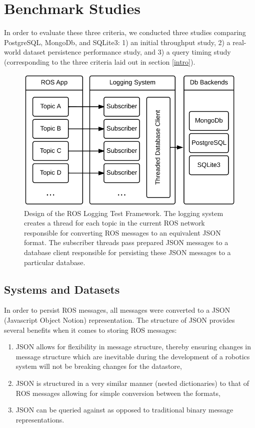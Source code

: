 \documentclass[nocopyrightspace]{acm_proc_article-sp}
\begin{document}
\section{Benchmark Studies}
In order to evaluate these three criteria, we conducted three studies comparing PostgreSQL, MongoDb, and SQLite3: 1) an initial throughput study, 2) a real-world dataset persistence performance study, and 3) a query timing study (corresponding to the three criteria laid out in section \ref{intro}).

\begin{figure}
    \centering
    \includegraphics[width=\linewidth]{images/roslog}
    \caption{Design of the ROS Logging Test Framework. The logging system creates a thread for each topic in the current ROS network responsible for converting ROS messages to an equivalent JSON format. The subscriber threads pass prepared JSON messages to a database client responsible for persisting these JSON messages to a particular database.}
    \label{fig:roslog}
\end{figure}

\subsection{Systems and Datasets}
In order to persist ROS messages, all messages were converted to a JSON (Javascript Object Notion) representation. The structure of JSON provides several benefits when it comes to storing ROS messages:
\begin{enumerate}
\item JSON allows for flexibility in message structure, thereby ensuring changes in message structure which are inevitable during the development of a robotics system will not be breaking changes for the datastore,
\item JSON is structured in a very similar manner (nested dictionaries) to that of ROS messages allowing for simple conversion between the formats,
\item JSON can be queried against as opposed to traditional binary message representations.
\end{enumerate}
\end{document}

